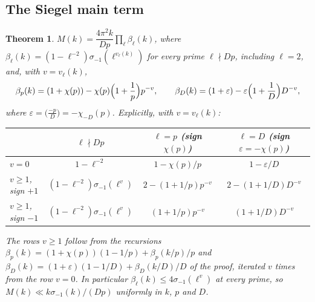 \documentclass[11pt]{amsart}
\newtheorem{theorem}{Theorem}[section]
\theoremstyle{remark}
\newcommand{\e}{\varepsilon}
\begin{document}
\subsection{The Siegel main term}
\begin{theorem}\label{thm:siegel}
$M(k)=\dfrac{4\pi^2k}{Dp}\prod_\ell\beta_\ell(k)$, where $\beta_\ell(k)=(1-\ell^{-2})\sigma_{-1}(\ell^{v_\ell(k)})$ for every prime $\ell\nmid Dp$, including $\ell=2$, and, with $v=v_\ell(k)$,
\[
\beta_p(k)=(1+\chi(p))-\chi(p)\Bigl(1+\frac1p\Bigr)p^{-v},\qquad \beta_D(k)=(1+\e)-\e\Bigl(1+\frac1D\Bigr)D^{-v},
\]
where $\e=\bigl(\frac{-p}D\bigr)=-\chi_{-D}(p)$. Explicitly, with $v=v_\ell(k)$:
\begin{center}\footnotesize
\begin{tabular}{l|ccc}
\toprule
 & $\ell\nmid Dp$ & $\ell=p$ (sign $\chi(p)$) & $\ell=D$ (sign $\e=-\chi(p)$)\\
\midrule
$v=0$ & $1-\ell^{-2}$ & $1-\chi(p)/p$ & $1-\e/D$\\
$v\ge1$, sign $+1$ & $(1-\ell^{-2})\sigma_{-1}(\ell^v)$ & $2-(1+1/p)p^{-v}$ & $2-(1+1/D)D^{-v}$\\
$v\ge1$, sign $-1$ & $(1-\ell^{-2})\sigma_{-1}(\ell^v)$ & $(1+1/p)p^{-v}$ & $(1+1/D)D^{-v}$\\
\bottomrule
\end{tabular}
\end{center}
The rows $v\ge1$ follow from the recursions $\beta_p(k)=(1+\chi(p))(1-1/p)+\beta_p(k/p)/p$ and $\beta_D(k)=(1+\e)(1-1/D)+\beta_D(k/D)/D$ of the proof, iterated $v$ times from the row $v=0$. In particular $\beta_\ell(k)\le4\sigma_{-1}(\ell^{v})$ at every prime, so $M(k)\ll k\sigma_{-1}(k)/(Dp)$ uniformly in $k$, $p$ and $D$.
\end{theorem}
\end{document}
